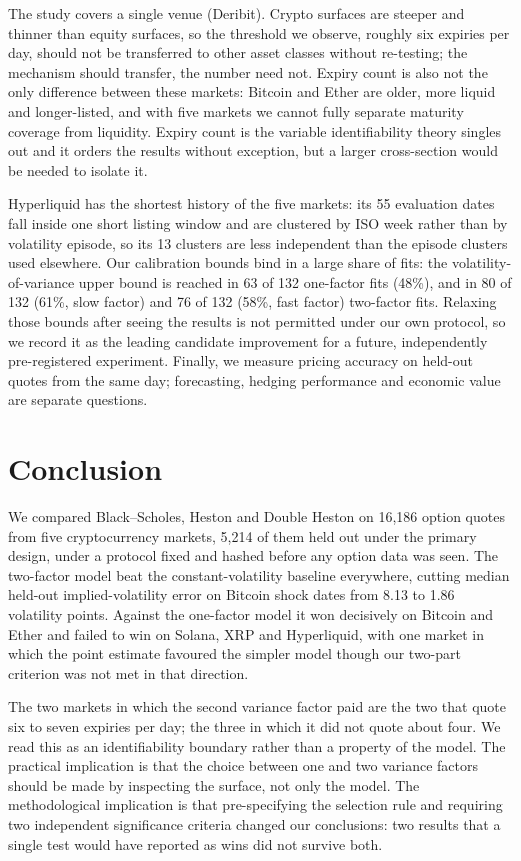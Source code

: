 \documentclass[runningheads]{llncs}
\begin{document}
The study covers a single venue (Deribit). Crypto surfaces are steeper and
thinner than equity surfaces, so the threshold we observe, roughly six
expiries per day, should not be transferred to other asset classes without
re-testing; the mechanism should transfer, the number need not. Expiry count
is also not the only difference between these markets: Bitcoin and Ether are
older, more liquid and longer-listed, and with five markets we cannot fully
separate maturity coverage from liquidity. Expiry count is the variable
identifiability theory singles out and it orders the results without
exception, but a larger cross-section would be needed to isolate it.

Hyperliquid has the shortest history of the five markets: its 55 evaluation
dates fall inside one short listing window and are clustered by ISO week rather
than by volatility episode, so its 13 clusters are less independent than the
episode clusters used elsewhere. Our calibration
bounds bind in a large share of fits: the volatility-of-variance upper bound is
reached in 63 of 132 one-factor fits (48\%), and in 80 of 132 (61\%, slow
factor) and 76 of 132 (58\%, fast factor) two-factor fits. Relaxing those bounds after seeing the results is not
permitted under our own protocol, so we record it as the leading candidate
improvement for a future, independently pre-registered experiment. Finally, we
measure pricing accuracy on held-out quotes from the same day; forecasting,
hedging performance and economic value are separate questions.

\section{Conclusion}

We compared Black--Scholes, Heston and Double Heston on 16,186 option
quotes from five cryptocurrency markets, 5,214 of them held out under the
primary design, under a protocol fixed and hashed before any option data was
seen. The two-factor model beat the constant-volatility
baseline everywhere, cutting median held-out implied-volatility error on
Bitcoin shock dates from 8.13 to 1.86 volatility points. Against the one-factor
model it won decisively on Bitcoin and Ether and failed to win on Solana, XRP
and Hyperliquid, with one market in which the point estimate favoured the
simpler model though our two-part criterion was not met in that direction.

The two markets in which the second variance factor paid are the two that quote
six to seven expiries per day; the three in which it did not quote about four.
We read this as an identifiability boundary rather than a property of the
model. The practical implication is that the choice between one and two
variance factors should be made by inspecting the surface, not only the model.
The methodological implication is that pre-specifying the selection rule and
requiring two independent significance criteria changed our conclusions: two
results that a single test would have reported as wins did not survive both.
\end{document}

